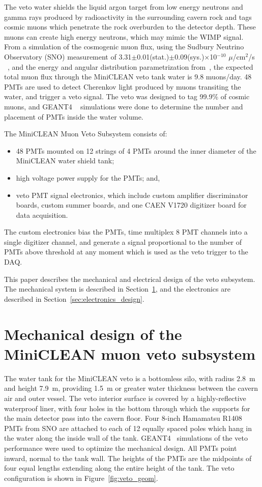 \documentclass[review,number,sort&compress]{elsarticle}
\begin{document}
The veto water shields the liquid argon target from low energy neutrons and gamma
rays produced by radioactivity in the surrounding cavern rock and tags cosmic muons
which penetrate the rock overburden to the detector depth. These muons can
create high energy neutrons, which may mimic the WIMP signal.
From a simulation of the cosmogenic muon flux, using the Sudbury Neutrino Observatory (SNO) measurement of
3.31$\pm$0.01(stat.)$\pm$0.09(sys.)$\times$10$^{-10}$ $\mu$/cm$^2$/s
~\cite{ref:sno_muon_flux}, and the energy and angular distribution
parametrization from~\cite{ref:mei_and_hime}, the expected total muon flux
through the MiniCLEAN veto tank water is 9.8 muons/day. 48 PMTs are used to
detect Cherenkov light produced by muons transiting the water, and trigger a
veto signal. The veto was designed to tag 99.9\% of cosmic muons, and GEANT4
~\cite{ref:geant4} simulations were done to determine the number and placement
of PMTs inside the water volume. 

The MiniCLEAN Muon Veto Subsystem consists of:
\begin{itemize}
\item 48 PMTs mounted on 12 strings of 4 PMTs around the inner diameter of the MiniCLEAN water shield tank;
\item high voltage power supply for the PMTs; and,
\item veto PMT signal electronics, which include custom amplifier discriminator boards, custom summer boards, and one CAEN V1720 digitizer board for data acquisition. 
\end{itemize}
The custom electronics bias the PMTs, time multiplex 8 PMT channels into a
single digitizer channel, and generate a signal proportional to the number
of PMTs above threshold at any moment which is used as the veto trigger to
the DAQ.

This paper describes the mechanical and electrical design of the veto
subsystem. The mechanical system is described in
Section~\ref{sec:subsystem_design}, and the electronics are
described in Section~\ref{sec:electronics_design}.


\section{Mechanical design of the MiniCLEAN muon veto subsystem}
\label{sec:subsystem_design}
%
The water tank for the MiniCLEAN veto is a bottomless silo, with
radius 2.8~m and height 7.9~m, providing 1.5~m or greater
water thickness between the cavern air and outer vessel. The veto
interior surface is covered by a highly-reflective waterproof liner,
with four holes in the bottom through which the supports for the main
detector pass into the cavern floor. Four 8-inch Hamamatsu R1408 PMTs
from SNO are attached to each of 12 equally spaced poles which hang in
the water along the inside wall of the tank. GEANT4~\cite{ref:geant4}
simulations of the veto performance were used to optimize the
mechanical design. All PMTs point inward, normal to the tank wall. The
heights of the PMTs are the midpoints of four equal lengths extending
along the entire height of the tank. The veto configuration is shown
in Figure~\ref{fig:veto_geom}.
\end{document}

